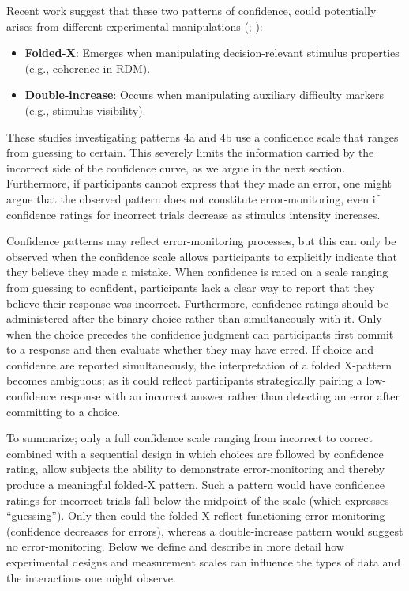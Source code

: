 \documentclass[
]{article}
\begin{document}
Recent work suggest that these two patterns of confidence, could
potentially arises from different experimental manipulations
(;
):

\begin{itemize}
\item
  \textbf{Folded-X}: Emerges when manipulating decision-relevant
  stimulus properties (e.g., coherence in RDM).
\item
  \textbf{Double-increase}: Occurs when manipulating auxiliary
  difficulty markers (e.g., stimulus visibility).
\end{itemize}

These studies investigating patterns 4a and 4b use a confidence scale
that ranges from guessing to certain. This severely limits the
information carried by the incorrect side of the confidence curve, as we
argue in the next section. Furthermore, if participants cannot express
that they made an error, one might argue that the observed pattern does
not constitute error-monitoring, even if confidence ratings for
incorrect trials decrease as stimulus intensity increases.

Confidence patterns may reflect error-monitoring processes, but this can
only be observed when the confidence scale allows participants to
explicitly indicate that they believe they made a mistake. When
confidence is rated on a scale ranging from guessing to confident,
participants lack a clear way to report that they believe their response
was incorrect. Furthermore, confidence ratings should be administered
after the binary choice rather than simultaneously with it. Only when
the choice precedes the confidence judgment can participants first
commit to a response and then evaluate whether they may have erred. If
choice and confidence are reported simultaneously, the interpretation of
a folded X-pattern becomes ambiguous; as it could reflect participants
strategically pairing a low-confidence response with an incorrect answer
rather than detecting an error after committing to a choice.

To summarize; only a full confidence scale ranging from incorrect to
correct combined with a sequential design in which choices are followed
by confidence rating, allow subjects the ability to demonstrate
error-monitoring and thereby produce a meaningful folded-X pattern. Such
a pattern would have confidence ratings for incorrect trials fall below
the midpoint of the scale (which expresses ``guessing''). Only then
could the folded-X reflect functioning error-monitoring (confidence
decreases for errors), whereas a double-increase pattern would suggest
no error-monitoring. Below we define and describe in more detail how
experimental designs and measurement scales can influence the types of
data and the interactions one might observe.
\end{document}
